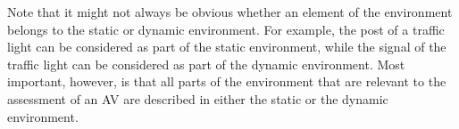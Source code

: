 Note that it might not always be obvious whether an element of the environment belongs to the static or dynamic environment. For example, the post of a traffic light can be considered as part of the static environment, while the signal of the traffic light can be considered as part of the dynamic environment. Most important, however, is that all parts of the environment that are relevant to the assessment of an AV are described in either the static or the dynamic environment.
